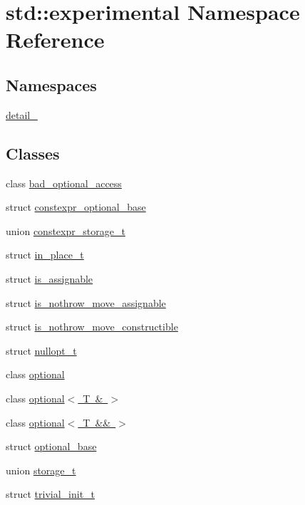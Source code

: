 \hypertarget{namespacestd_1_1experimental}{}\section{std\+:\+:experimental Namespace Reference}
\label{namespacestd_1_1experimental}
\subsection*{Namespaces}
\begin{DoxyCompactItemize}
\item 
 \mbox{\hyperlink{namespacestd_1_1experimental_1_1detail__}{detail\+\_\+}}
\end{DoxyCompactItemize}
\subsection*{Classes}
\begin{DoxyCompactItemize}
\item 
class \mbox{\hyperlink{classstd_1_1experimental_1_1bad__optional__access}{bad\+\_\+optional\+\_\+access}}
\item 
struct \mbox{\hyperlink{structstd_1_1experimental_1_1constexpr__optional__base}{constexpr\+\_\+optional\+\_\+base}}
\item 
union \mbox{\hyperlink{unionstd_1_1experimental_1_1constexpr__storage__t}{constexpr\+\_\+storage\+\_\+t}}
\item 
struct \mbox{\hyperlink{structstd_1_1experimental_1_1in__place__t}{in\+\_\+place\+\_\+t}}
\item 
struct \mbox{\hyperlink{structstd_1_1experimental_1_1is__assignable}{is\+\_\+assignable}}
\item 
struct \mbox{\hyperlink{structstd_1_1experimental_1_1is__nothrow__move__assignable}{is\+\_\+nothrow\+\_\+move\+\_\+assignable}}
\item 
struct \mbox{\hyperlink{structstd_1_1experimental_1_1is__nothrow__move__constructible}{is\+\_\+nothrow\+\_\+move\+\_\+constructible}}
\item 
struct \mbox{\hyperlink{structstd_1_1experimental_1_1nullopt__t}{nullopt\+\_\+t}}
\item 
class \mbox{\hyperlink{classstd_1_1experimental_1_1optional}{optional}}
\item 
class \mbox{\hyperlink{classstd_1_1experimental_1_1optional_3_01_t_01_6_01_4}{optional$<$ T \& $>$}}
\item 
class \mbox{\hyperlink{classstd_1_1experimental_1_1optional_3_01_t_01_6_6_01_4}{optional$<$ T \&\& $>$}}
\item 
struct \mbox{\hyperlink{structstd_1_1experimental_1_1optional__base}{optional\+\_\+base}}
\item 
union \mbox{\hyperlink{unionstd_1_1experimental_1_1storage__t}{storage\+\_\+t}}
\item 
struct \mbox{\hyperlink{structstd_1_1experimental_1_1trivial__init__t}{trivial\+\_\+init\+\_\+t}}
\end{DoxyCompactItemize}
